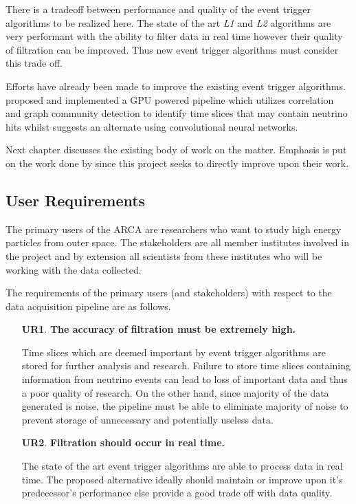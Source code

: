 There is a tradeoff between performance and quality of the event trigger
algorithms to be realized here. The state of the art \emph{L1} and \emph{L2}
algorithms are very performant with the ability to filter data in real time
however their quality of filtration can be improved. Thus new event trigger
algorithms must consider this trade off.

Efforts have already been made to improve the existing event trigger
algorithms. \cite{karas2019data} proposed and implemented a GPU powered
pipeline which utilizes correlation and graph community detection to identify
time slices that may contain neutrino hits whilst \cite{post2019km3nnet}
suggests an alternate using convolutional neural networks.

Next chapter discusses the existing body of work on the matter.
Emphasis is put on the work done by \citeauthor{karas2019data} since
this project seeks to directly improve upon their work.

\subsection{User Requirements}\label{user-requirements}

The primary users of the ARCA are researchers who want to study high energy
particles from outer space. The stakeholders are all member institutes involved
in the project and by extension all scientists from these institutes who will
be working with the data collected.

The requirements of the primary users (and stakeholders) with respect to the
data acquisition pipeline are as follows.

\begin{enumerate}
  \item[\textbf{UR1}.]\textbf{The accuracy of filtration must be extremely high.}

    Time slices which are deemed important by event trigger algorithms
    are stored for further analysis and research. Failure to store
    time slices containing information from neutrino events can lead
    to loss of important data and thus a poor quality of research. On
    the other hand, since majority of the data generated is noise, the
    pipeline must be able to eliminate majority of noise to prevent
    storage of unnecessary and potentially useless data.

  \item[\textbf{UR2}.] \textbf{Filtration should occur in real time.}

    The state of the art event trigger algorithms are able to process
    data in real time. The proposed alternative ideally should
    maintain or improve upon it's predecessor's performance else
    provide a good trade off with data quality.

\end{enumerate}

